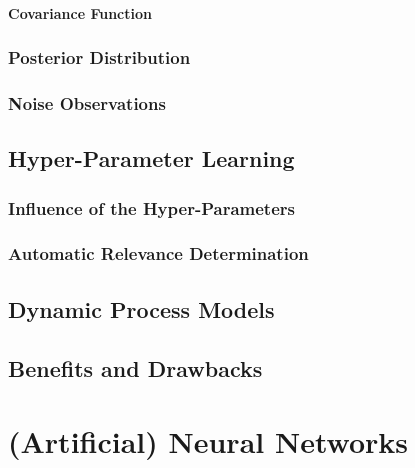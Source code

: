                 \paragraph{Covariance Function} %

            \subsubsection{Posterior Distribution} %

            \subsubsection{Noise Observations} %

        \subsection{Hyper-Parameter Learning} %

            \subsubsection{Influence of the Hyper-Parameters} %

            \subsubsection{Automatic Relevance Determination} %

        \subsection{Dynamic Process Models} %

        \subsection{Benefits and Drawbacks} %

    \section{(Artificial) Neural Networks} %

